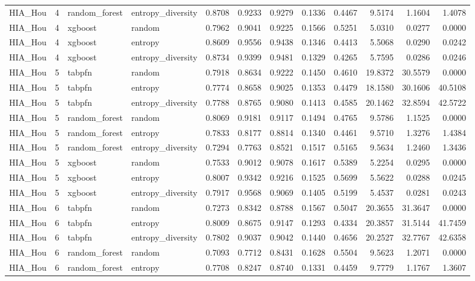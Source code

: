 \begin{tabular}{lrllrrrrrrrr}
HIA_Hou & 4 & random_forest & entropy_diversity & 0.8708 & 0.9233 & 0.9279 & 0.1336 & 0.4467 & 9.5174 & 1.1604 & 1.4078 \\
HIA_Hou & 4 & xgboost & random & 0.7962 & 0.9041 & 0.9225 & 0.1566 & 0.5251 & 5.0310 & 0.0277 & 0.0000 \\
HIA_Hou & 4 & xgboost & entropy & 0.8609 & 0.9556 & 0.9438 & 0.1346 & 0.4413 & 5.5068 & 0.0290 & 0.0242 \\
HIA_Hou & 4 & xgboost & entropy_diversity & 0.8734 & 0.9399 & 0.9481 & 0.1329 & 0.4265 & 5.7595 & 0.0286 & 0.0246 \\
HIA_Hou & 5 & tabpfn & random & 0.7918 & 0.8634 & 0.9222 & 0.1450 & 0.4610 & 19.8372 & 30.5579 & 0.0000 \\
HIA_Hou & 5 & tabpfn & entropy & 0.7774 & 0.8658 & 0.9025 & 0.1353 & 0.4479 & 18.1580 & 30.1606 & 40.5108 \\
HIA_Hou & 5 & tabpfn & entropy_diversity & 0.7788 & 0.8765 & 0.9080 & 0.1413 & 0.4585 & 20.1462 & 32.8594 & 42.5722 \\
HIA_Hou & 5 & random_forest & random & 0.8069 & 0.9181 & 0.9117 & 0.1494 & 0.4765 & 9.5786 & 1.1525 & 0.0000 \\
HIA_Hou & 5 & random_forest & entropy & 0.7833 & 0.8177 & 0.8814 & 0.1340 & 0.4461 & 9.5710 & 1.3276 & 1.4384 \\
HIA_Hou & 5 & random_forest & entropy_diversity & 0.7294 & 0.7763 & 0.8521 & 0.1517 & 0.5165 & 9.5634 & 1.2460 & 1.3436 \\
HIA_Hou & 5 & xgboost & random & 0.7533 & 0.9012 & 0.9078 & 0.1617 & 0.5389 & 5.2254 & 0.0295 & 0.0000 \\
HIA_Hou & 5 & xgboost & entropy & 0.8007 & 0.9342 & 0.9216 & 0.1525 & 0.5699 & 5.5622 & 0.0288 & 0.0245 \\
HIA_Hou & 5 & xgboost & entropy_diversity & 0.7917 & 0.9568 & 0.9069 & 0.1405 & 0.5199 & 5.4537 & 0.0281 & 0.0243 \\
HIA_Hou & 6 & tabpfn & random & 0.7273 & 0.8342 & 0.8788 & 0.1567 & 0.5047 & 20.3655 & 31.3647 & 0.0000 \\
HIA_Hou & 6 & tabpfn & entropy & 0.8009 & 0.8675 & 0.9147 & 0.1293 & 0.4334 & 20.3857 & 31.5144 & 41.7459 \\
HIA_Hou & 6 & tabpfn & entropy_diversity & 0.7802 & 0.9037 & 0.9042 & 0.1440 & 0.4656 & 20.2527 & 32.7767 & 42.6358 \\
HIA_Hou & 6 & random_forest & random & 0.7093 & 0.7712 & 0.8431 & 0.1628 & 0.5504 & 9.5623 & 1.2071 & 0.0000 \\
HIA_Hou & 6 & random_forest & entropy & 0.7708 & 0.8247 & 0.8740 & 0.1331 & 0.4459 & 9.7779 & 1.1767 & 1.3607 \\

\end{tabular}
